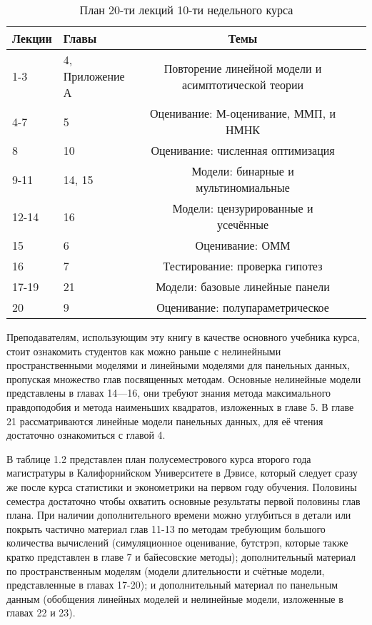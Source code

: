 \begin{table}[h]
\begin{center}
\caption{\label{tab:plan}План 20-ти лекций 10-ти недельного курса}
\begin{tabular}[t]{llcll|}
\hline
\bf{Лекции} & \bf{Главы} & \bf{Темы} \\
\hline
1-3   & 4, Приложение А & Повторение линейной модели и асимптотической теории \\
4-7   & 5               & Оценивание: М-оценивание, ММП, и НМНК\\
8     & 10              & Оценивание: численная оптимизация \\
9-11  & 14, 15          & Модели: бинарные и мультиномиальные \\
12-14 & 16              & Модели: цензурированные и усечённые \\
15    & 6               & Оценивание: ОММ \\
16    & 7               & Тестирование: проверка гипотез \\
17-19 & 21              & Модели: базовые линейные панели \\
20    & 9               & Оценивание: полупараметрическое \\
\hline
\end{tabular}
\end{center}
\end{table}
	
Преподавателям,  использующим эту книгу в качестве основного учебника курса, стоит ознакомить студентов как можно раньше с нелинейными пространственными моделями и линейными моделями для панельных данных, пропуская множество глав посвященных методам.
Основные нелинейные модели представлены в главах 14---16, они требуют знания метода максимального правдоподобия и метода наименьших квадратов, изложенных в главе 5. В главе 21 рассматриваются линейные модели панельных данных, для её чтения достаточно ознакомиться с главой 4.
	
	
В таблице 1.2 представлен план полусеместрового курса второго года магистратуры в Калифорнийском Университете в Дэвисе, который следует сразу же после курса статистики и эконометрики на первом году обучения. Половины семестра достаточно чтобы охватить основные результаты первой половины глав плана.
При наличии дополнительного времени можно углубиться в детали или покрыть частично материал глав 11-13 по методам требующим большого количества вычислений (симуляционное оценивание, бутстрэп, которые также кратко представлен в главе 7 и байесовские методы); дополнительный материал по пространственным моделям (модели длительности и счётные модели, представленные в главах 17-20); и дополнительный материал по панельным данным (обобщения линейных моделей и нелинейные модели, изложенные в главах 22 и 23).

